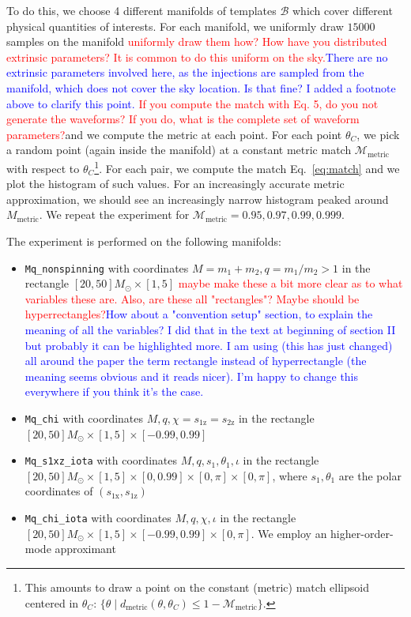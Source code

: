 \documentclass[twocolumn,showpacs,preprintnumbers,nofootinbib,prd,
superscriptaddress,10pt]{revtex4-2}
\begin{document}
To do this, we choose 4 different manifolds of templates $\mathcal{B}$ which cover different physical quantities of interests. For each manifold, we uniformly draw $15000$ samples on the manifold \textcolor{red}{uniformly draw them how? How have you distributed extrinsic parameters? It is common to do this uniform on the sky.}\textcolor{blue}{There are no extrinsic parameters involved here, as the injections are sampled from the manifold, which does not cover the sky location. Is that fine? I added a footnote above to clarify this point.} \textcolor{red}{If you compute the match with Eq. 5, do you not generate the waveforms? If you do, what is the complete set of waveform parameters?}and we compute the metric at each point.
For each point $\theta_C$, we pick a random point (again inside the manifold) at a constant metric match $\mathcal{M}_{\text{metric}}$ with respect to $\theta_C$\footnote{
This amounts to draw a point on the constant (metric) match ellipsoid centered in
$\theta_C$: $\{\theta \; | \; d_{\text{metric}}(\theta,\theta_C) \leq 1-\mathcal{M}_{\text{metric}} \}$.
}.
For each pair, we compute the match Eq.~\eqref{eq:match} and we plot the histogram of such values. For an increasingly accurate metric approximation, we should see an increasingly narrow histogram peaked around $M_{\text{metric}}$.
We repeat the experiment for $\mathcal{M}_{\text{metric}} = 0.95, 0.97, 0.99, 0.999$.

The experiment is performed on the following manifolds:
\begin{itemize}
	\item \texttt{Mq\_nonspinning} with coordinates $M = m_1+m_2, q = m_1/m_2>1$ in the rectangle $[20, 50] M_\odot \times [1,5]$ \textcolor{red}{maybe make these a bit more clear as to what variables these are. Also, are these all "rectangles"? Maybe should be hyperrectangles?}\textcolor{blue}{How about a "convention setup" section, to explain the meaning of all the variables? I did that in the text at beginning of section II but probably it can be highlighted more. I am using (this has just changed) all around the paper the term rectangle instead of hyperrectangle (the meaning seems obvious and it reads nicer). I'm happy to change this everywhere if you think it's the case.}
	\item \texttt{Mq\_chi} with coordinates $M, q, \chi = s_\text{1z} = s_\text{2z}$ in the rectangle $[20, 50] M_\odot \times [1,5] \times [-0.99, 0.99]$
	\item \texttt{Mq\_s1xz\_iota} with coordinates $M, q, s_\text{1}, \theta_1, \iota$ in the rectangle $[20, 50] M_\odot \times [1,5] \times [0, 0.99] \times [0,\pi]  \times [0,\pi]$, where $s_1, \theta_1$ are the polar coordinates of $(s_\text{1x}, s_\text{1z})$
	\item \texttt{Mq\_chi\_iota} with coordinates $M, q, \chi, \iota$ in the rectangle $[20, 50] M_\odot \times [1,5] \times [-0.99, 0.99] \times [0,\pi]$. We employ an higher-order-mode approximant
\end{itemize}
\end{document}
